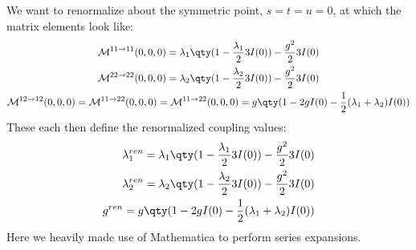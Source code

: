 \documentclass[12pt]{article}
\begin{document}
We want to renormalize about the symmetric point, $s=t=u=0$, at which the matrix elements look like:
\begin{gather*}
  \mathcal{M}^{11\to11}(0,0,0)=
  \lambda_1\qty(1-\frac{\lambda_1}23I(0))-\frac{g^2}23I(0)\\
  \mathcal{M}^{22\to22}(0,0,0)=
  \lambda_2\qty(1-\frac{\lambda_2}23I(0))-\frac{g^2}23I(0)\\
  \mathcal{M}^{12\to12}(0,0,0)=
  \mathcal{M}^{11\to22}(0,0,0)=
  \mathcal{M}^{11\to22}(0,0,0)=
  g\qty(1-2gI(0)-\frac12(\lambda_1+\lambda_2)I(0))
\end{gather*}
These each then define the renormalized coupling values:
\begin{align*}
  \lambda_1^{ren}=\lambda_1\qty(1-\frac{\lambda_1}23I(0))-\frac{g^2}23I(0)\\
  \lambda_2^{ren}=\lambda_2\qty(1-\frac{\lambda_2}23I(0))-\frac{g^2}23I(0)\\
  g^{ren}=g\qty(1-2gI(0)-\frac12(\lambda_1+\lambda_2)I(0))
\end{align*}
Here we heavily made use of Mathematica to perform series expansions.
\end{document}
